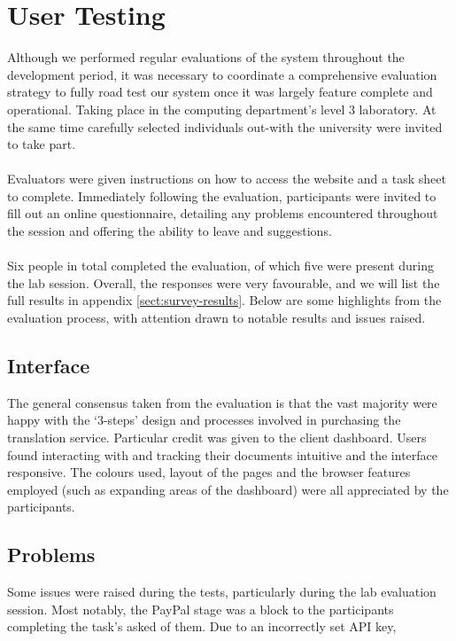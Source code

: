 \documentclass{l3proj}
\begin{document}
\section{User Testing}
\label{sect:testing}
Although we performed regular evaluations of the system throughout the development
period, it was necessary to coordinate a comprehensive evaluation strategy to
fully road test our system once it was largely feature complete and operational.
Taking place in the computing department's level 3 laboratory.  At the same time
carefully selected individuals out-with the university were invited to take
part.\\
\\
Evaluators were given instructions on how to access the website and a task sheet
to complete. Immediately following the evaluation, participants were invited to
fill out an online questionnaire, detailing any problems encountered throughout the
session and offering the ability to leave and suggestions.\\
\\
Six people in total completed the evaluation, of which five were present during the
lab session. Overall, the responses were very favourable, and we will list the
full results in appendix \ref{sect:survey-results}. Below are some highlights
from the evaluation process, with attention drawn to notable results and issues
raised.

\subsection{Interface}
The general consensus taken from the evaluation is that the vast majority were
happy with the `3-steps' design and processes involved in purchasing the translation
service. Particular credit was given to the client dashboard. Users found
interacting with and tracking their documents intuitive and the interface
responsive. The colours used, layout of the pages and the browser features employed (such as
expanding areas of the dashboard) were all appreciated by the participants.
 
\subsection{Problems}
Some issues were raised during the tests, particularly during the lab evaluation
session. Most notably, the PayPal stage was a block to the participants
completing the task's asked of them. Due to an incorrectly set API key,
\end{document}

